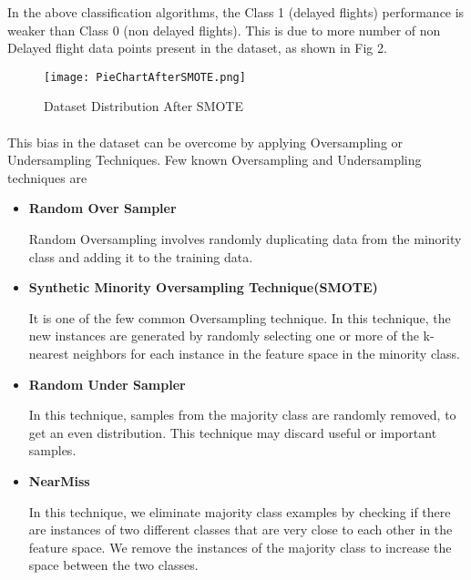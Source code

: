 \documentclass[12pt,letterpaper]{article}
\begin{document}
    In the above classification algorithms, the Class 1 (delayed flights) performance is weaker than Class 0 (non delayed flights). This is due to more number of non Delayed flight data points present in the dataset, as shown in Fig 2.
    
   \begin{figure}%
        \begin{center}
          \texttt{[image: PieChartAfterSMOTE.png]}%
            \caption{Dataset Distribution After SMOTE}%
        \end{center}
    \end{figure}
    
    \paragraph{}
        This bias in the dataset can be overcome by applying Oversampling or Undersampling Techniques. Few known Oversampling and Undersampling techniques are 
        
        \begin{itemize}
        
            \item\textbf{Random Over Sampler}
            
                Random Oversampling involves randomly duplicating data from the minority class and adding it to the training data.
                
            \item\textbf{Synthetic Minority Oversampling Technique(SMOTE)}
            
                It is one of the few common Oversampling technique. In this technique, the new instances are generated by randomly selecting one or more of the k-nearest neighbors for each instance in the feature space in the minority class.
                
            \item\textbf{Random Under Sampler}
            
                In this technique, samples from the majority class are randomly removed, to get an even distribution. This technique may discard useful or important samples.
                
            \item\textbf{NearMiss}
            
                In this technique, we eliminate majority class examples by checking if there are instances of two different classes that are very close to each other in the feature space. We remove the instances of the majority class to increase the space between the two classes.
                
        \end{itemize}
\end{document}

